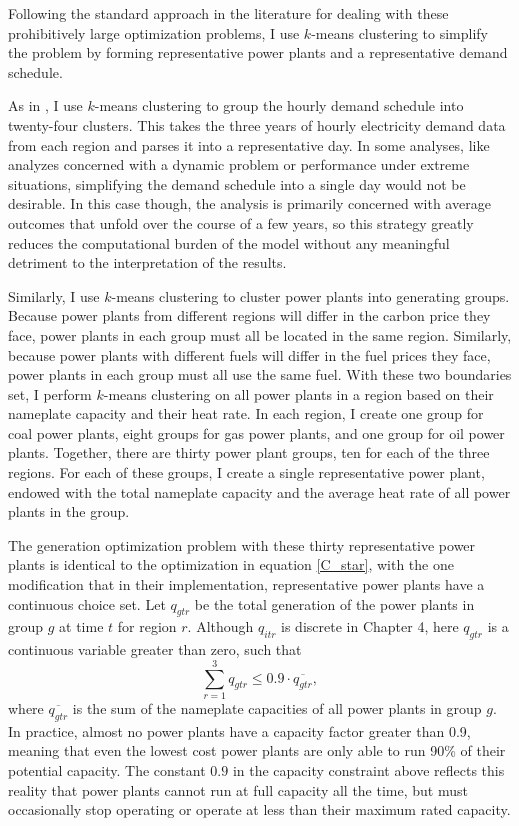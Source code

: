 Following the standard approach in the literature for dealing with these prohibitively large optimization problems, I use $k$-means clustering to simplify the problem by forming representative power plants and a representative demand schedule. 

As in \cite{fowlie2021border}, I use $k$-means clustering to group the hourly demand schedule into twenty-four clusters. This takes the three years of hourly electricity demand data from each region and parses it into a representative day. In some analyses, like analyzes concerned with a dynamic problem or performance under extreme situations, simplifying the demand schedule into a single day would not be desirable. In this case though, the analysis is primarily concerned with average outcomes that unfold over the course of a few years, so this strategy greatly reduces the computational burden of the model without any meaningful detriment to the interpretation of the results. 

Similarly, I use $k$-means clustering to cluster power plants into generating groups. Because power plants from different regions will differ in the carbon price they face, power plants in each group must all be located in the same region. Similarly, because power plants with different fuels will differ in the fuel prices they face, power plants in each group must all use the same fuel. With these two boundaries set, I perform $k$-means clustering on all power plants in a region based on their nameplate capacity and their heat rate. In each region, I create one group for coal power plants, eight groups for gas power plants, and one group for oil power plants. Together, there are thirty power plant groups, ten for each of the three regions. For each of these groups, I create a single representative power plant, endowed with the total nameplate capacity and the average heat rate of all power plants in the group. 

The generation optimization problem with these thirty representative power plants is identical to the optimization in equation \ref{C_star}, with the one modification that in their implementation, representative power plants have a continuous choice set. Let $q_{gtr}$ be the total generation of the power plants in group $g$ at time $t$ for region $r$. Although $q_{itr}$ is discrete in Chapter 4, here $q_{gtr}$ is a continuous variable greater than zero, such that
\begin{equation}
    \sum_{r = 1}^3 q_{gtr} \leq 0.9 \cdot \overline{q_{gtr}},
\end{equation} 
where $\overline{q_{gtr}}$ is the sum of the nameplate capacities of all power plants in group $g$. In practice, almost no power plants have a capacity factor greater than 0.9, meaning that even the lowest cost power plants are only able to run 90\% of their potential capacity. The constant $0.9$ in the capacity constraint above reflects this reality that power plants cannot run at full capacity all the time, but must occasionally stop operating or operate at less than their maximum rated capacity. 

